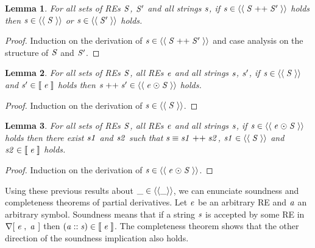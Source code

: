 \documentclass[fleqn,10pt]{SelfArx} %
\newtheorem{Lemma}{Lemma}
\theoremstyle{definition}
\newcommand{\D}[1]{\blue{\mathsf{#1}}}
\newcommand{\C}[1]{\red{\mathsf{#1}}}
\newcommand{\F}[1]{\green{\mathsf{#1}}}
\newcommand{\V}[1]{\purple{\mathit{#1}}}
\begin{document}
\begin{Lemma}\label{wapp}
For all sets of REs \ensuremath{\V{S}}, \ensuremath{\V{S'}} and all strings \ensuremath{\V{s}}, if \ensuremath{\V{s}\;\D{\in\langle\langle}\;\V{S}\;\F{++}\;\V{S'}\;\D{\rangle\rangle}} holds then \ensuremath{\V{s}\;\D{\in\langle\langle}\;\V{S}\;\D{\rangle\rangle}} or
\ensuremath{\V{s}\;\D{\in\langle\langle}\;\V{S'}\;\D{\rangle\rangle}} holds.
\end{Lemma}
\begin{proof}
  Induction on the derivation of \ensuremath{\V{s}\;\D{\in\langle\langle}\;\V{S}\;\F{++}\;\V{S'}\;\D{\rangle\rangle}} and case analysis on the
  structure of \ensuremath{\V{S}} and \ensuremath{\V{S'}}.
\end{proof}

\begin{Lemma}\label{wop}
  For all sets of REs \ensuremath{\V{S}}, all REs \ensuremath{\V{e}} and all strings \ensuremath{\V{s}}, \ensuremath{\V{s'}}, if \ensuremath{\V{s}\;\D{\in\langle\langle}\;\V{S}\;\D{\rangle\rangle}} and \ensuremath{\V{s'}\;\D{\in\llbracket}\;\V{e}\;\D{\rrbracket}} holds then
  \ensuremath{\V{s}\;\F{++}\;\V{s'}\;\D{\in\langle\langle}\;\V{e}\;\F{\odot}\;\V{S}\;\D{\rangle\rangle}} holds.
\end{Lemma}
\begin{proof}
  Induction on the derivation of \ensuremath{\V{s}\;\D{\in\langle\langle}\;\V{S}\;\D{\rangle\rangle}}.
\end{proof}

\begin{Lemma}\label{wopeq}
  For all sets of REs \ensuremath{\V{S}}, all REs \ensuremath{\V{e}} and all strings \ensuremath{\V{s}}, if \ensuremath{\V{s}\;\D{\in\langle\langle}\;\V{e}\;\F{\odot}\;\V{S}\;\D{\rangle\rangle}} holds then there exist \ensuremath{\V{s1}} and \ensuremath{\V{s2}} such that
  \ensuremath{\V{s}\;\D{\equiv}\;\V{s1}\;\F{++}\;\V{s2}}, \ensuremath{\V{s1}\;\D{\in\langle\langle}\;\V{S}\;\D{\rangle\rangle}} and \ensuremath{\V{s2}\;\D{\in\llbracket}\;\V{e}\;\D{\rrbracket}} holds.
\end{Lemma}
\begin{proof}
  Induction on the derivation of \ensuremath{\V{s}\;\D{\in\langle\langle}\;\V{e}\;\F{\odot}\;\V{S}\;\D{\rangle\rangle}}.
\end{proof}

Using these previous results about \ensuremath{\D{\_\in\langle\langle\_\rangle\rangle}}, we can enunciate soundness and completeness theorems
of partial derivatives. Let \ensuremath{\V{e}} be an arbitrary RE and \ensuremath{\V{a}} an arbitrary symbol. Soundness means that if a
string \ensuremath{\V{s}} is accepted by some RE in \ensuremath{\F{\nabla[}\;\V{e}\;\red{,}\,\;\V{a}\;\mskip1.5mu]} then \ensuremath{(\V{a}\;\C{::}\;\V{s})\;\D{\in\llbracket}\;\V{e}\;\D{\rrbracket}}. The completeness theorem shows
that the other direction of the soundness implication also holds.
\end{document}
